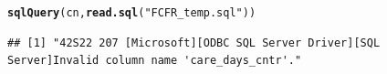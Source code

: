 \documentclass[12pt]{article}\usepackage[]{graphicx}\usepackage[]{color}
\makeatletter
\newcommand{\hlstr}[1]{\textcolor[rgb]{0.192,0.494,0.8}{#1}}%
\newcommand{\hlstd}[1]{\textcolor[rgb]{0.345,0.345,0.345}{#1}}%
\newcommand{\hlkwd}[1]{\textcolor[rgb]{0.737,0.353,0.396}{\textbf{#1}}}%
\newenvironment{kframe}{%
 \def\at@end@of@kframe{}%
 \ifinner\ifhmode%
  \def\at@end@of@kframe{\end{minipage}}%
  \begin{minipage}{\columnwidth}%
 \fi\fi%
 \def\FrameCommand##1{\hskip\@totalleftmargin \hskip-\fboxsep
 \colorbox{shadecolor}{##1}\hskip-\fboxsep
     \hskip-\linewidth \hskip-\@totalleftmargin \hskip\columnwidth}%
 \MakeFramed {\advance\hsize-\width
   \@totalleftmargin\z@ \linewidth\hsize
   \@setminipage}}%
 {\par\unskip\endMakeFramed%
 \at@end@of@kframe}
\newenvironment{knitrout}{}{} %
\makeatother
\begin{document}
\begin{knitrout}
\color{fgcolor}\begin{kframe}
\begin{alltt}
\hlkwd{sqlQuery}\hlstd{(cn,} \hlkwd{read.sql}\hlstd{(}\hlstr{"FCFR_temp.sql"}\hlstd{))}
\end{alltt}
\begin{verbatim}
## [1] "42S22 207 [Microsoft][ODBC SQL Server Driver][SQL Server]Invalid column name 'care_days_cntr'."                                                                                                                                                                                                                                                                                                                                                                                                                                                                                                                                                                                                                                                                                                                                                                                                                                                                                                                                                                                                                                                                                                                                                                                                                                                                                                                                                                                                                                                                                                                                                                                                                                                                                                                                                                                                                                                                                                                                                                                                                                                                                                                                                                                                                                                                                                                                                                                                                                                                                                                               

\end{verbatim}
\end{kframe}
\end{knitrout}
\end{document}
